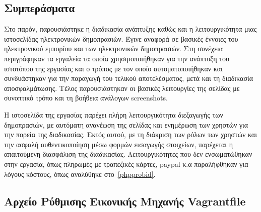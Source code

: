 \documentclass[12pt]{report}
\begin{document}
\section{Συμπεράσματα}
Στο παρόν, παρουσιάστηκε η διαδικασία ανάπτυξης καθώς και η λειτουργικότητα μιας ιστοσελίδας ηλεκτρονικών δημοπρασιών. Έγινε αναφορά σε βασικές έννοιες του ηλεκτρονικού εμπορίου και των ηλεκτρονικών δημοπρασιών. Στη συνέχεια περιγράφηκαν τα εργαλεία τα οποία χρησιμοποιήθηκαν για την ανάπτυξη του ιστοτόπου της εργασίας και ο τρόπος με τον οποίο αυτοματοποιήθηκαν και συνδυάστηκαν για την παραγωγή του τελικού αποτελέσματος, μετά και τη διαδικασία αποσφαλμάτωσης. Τέλος παρουσιάστηκαν οι βασικές λειτουργίες της σελίδας με συνοπτικό τρόπο και τη βοήθεια ανάλογων \textlatin{screenshots}.

Η ιστοσελίδα της εργασίας παρέχει πλήρη λειτουργικότητα διεξαγωγής των δημοπρασιών, με αυτόματη ανανέωση της σελίδας και ενημέρωση των χρηστών για την πορεία της διαδικασίας. Εκτός αυτού, με τη διάκριση των ρόλων των χρηστών και την ασφαλή αυθεντικοποίηση μέσω φορμών εισαγωγής στοιχείων, παρέχεται η απαιτούμενη διασφάλιση της διαδικασίας. Λειτουργικότητες που δεν ενσωματώθηκαν στην εργασία, όπως πληρωμές με τραπεζικές κάρτες, \textlatin{paypal} κ.α παραλήφθηκαν για λόγους κόστους, όπως αναλύθηκε στο~\ref{phpprobid}.

\begin{appendices}
\chapter{Αρχείο Ρύθμισης Εικονικής Μηχανής \textlatin{Vagrantfile}}\label{AppA}
\inputminted[linenos, fontsize=\scriptsize, breaklines, baselinestretch=1]{ruby}{sources/Vagrantfile}
\end{appendices}

\appendix



\end{document}
